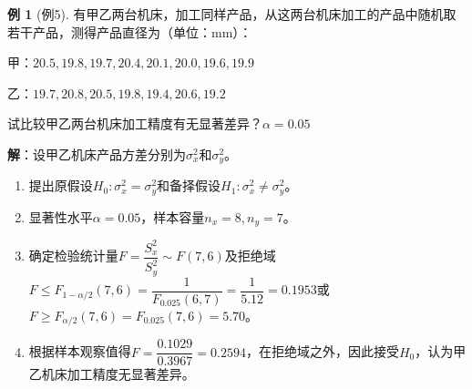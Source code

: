 \documentclass[11pt,a4paper]{report}
\theoremstyle{definition}
\newtheorem{example}{例}[chapter]
\theoremstyle{plain}
\begin{document}
\begin{example}[例5]
有甲乙两台机床，加工同样产品，从这两台机床加工的产品中随机取若干产品，测得产品直径为（单位：mm）：

甲：$20.5,19.8,19.7,20.4,20.1,20.0,19.6,19.9$

乙：$19.7,20.8,20.5,19.8,19.4,20.6,19.2$

试比较甲乙两台机床加工精度有无显著差异？$\alpha=0.05$

\textbf{解}：设甲乙机床产品方差分别为$\sigma_x^2$和$\sigma_y^2$。
\begin{enumerate}[label=步骤\arabic*.,leftmargin=2em]
    \item 提出原假设$H_0:\sigma_x^2=\sigma_y^2$和备择假设$H_1:\sigma_x^2\neq\sigma_y^2$。
    \item 显著性水平$\alpha=0.05$，样本容量$n_x=8,n_y=7$。
    \item 确定检验统计量$F=\dfrac{S_x^2}{S_y^2}\sim F(7,6)$及拒绝域$F\leq F_{1-\alpha/2}(7,6)=\dfrac{1}{F_{0.025}(6,7)}=\dfrac{1}{5.12}=0.1953$或$F\geq F_{\alpha/2}(7,6)=F_{0.025}(7,6)=5.70$。
    \item 根据样本观察值得$F=\dfrac{0.1029}{0.3967}=0.2594$，在拒绝域之外，因此接受$H_0$，认为甲乙机床加工精度无显著差异。
\end{enumerate}
\end{example}
\end{document}
